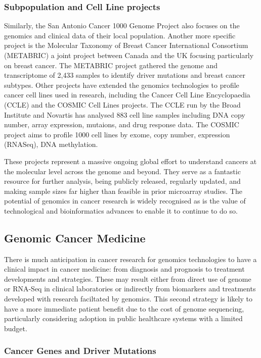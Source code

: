 \subsubsection{Subpopulation and Cell Line projects}
Similarly, the San Antonio Cancer 1000 Genome Project also focuses on the genomics and clinical data of their local population. Another more specific project is the Molecular Taxonomy of Breast Cancer International Consortium (METABRIC) a joint project between Canada and the UK focusing particularly on breast cancer. The METABRIC project gathered the genome and transcriptome of 2,433 samples to identify driver mutations and breast cancer subtypes. Other projects have extended the genomics technologies to profile cancer cell lines used in research, including the Cancer Cell Line Encyclopaedia (CCLE) and the COSMIC Cell Lines projects. The CCLE run by the Broad Institute and Novartis has analysed 883 cell line samples including DNA copy number, array expression, mutaions, and  drug response data. The COSMIC project aims to profile 1000 cell lines by exome, copy number, expression (RNASeq), DNA methylation.

These projects represent a massive ongoing global effort to understand cancers at the molecular level across the genome and beyond. They serve as a fantastic resource for further analysis, being publicly released, regularly updated, and making sample sizes far higher than feasible in prior microarray studies. The potential of genomics in cancer research is widely recognised as is the value of technological and bioinformatics advances to enable it to continue to do so. 


\subsection{Genomic Cancer Medicine}
There is much anticipation in cancer research for genomics technologies to have a clinical impact in cancer medicine: from diagnosis and prognosis to treatment developments and strategies. These may result either from direct use of genome or RNA-Seq in clinical laboratories or indirectly from biomarkers and treatments developed with research faciltated by genomics. This second strategy is likely to have a more immediate patient benefit due to the cost of genome sequencing, particularly considering adoption in public healthcare systems with a limited budget.  

\subsubsection{Cancer Genes and Driver Mutations}


